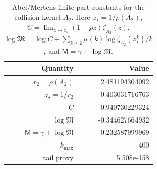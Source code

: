 \begin{table}[H]
\centering
\scriptsize
\setlength{\tabcolsep}{6pt}
\caption{Abel/Mertens finite-part constants for the collision kernel $A_2$. Here $z_\star=1/\rho(A_2)$, $C=\lim_{z\to z_\star}(1-\rho z)\zeta_{A_2}(z)$, $\log\mathfrak{M}=\log C+\sum_{k\ge2}\mu(k)\log\zeta_{A_2}(z_\star^k)/k$, and $\mathsf{M}=\gamma+\log\mathfrak{M}$.}
\label{tab:collision_kernel_A2_finite_part}
\begin{tabular}{r r}
\toprule
Quantity & Value\\
\midrule
$r_2=\rho(A_2)$ & 2.481194304092\\
$z_\star=1/r_2$ & 0.403031716763\\
$C$ & 0.940730229324\\
$\log\mathfrak{M}$ & -0.344627664932\\
$\mathsf{M}=\gamma+\log\mathfrak{M}$ & 0.232587999969\\
$k_{\max}$ & 400\\
tail proxy & 5.508e-158\\
\bottomrule
\end{tabular}
\end{table}
